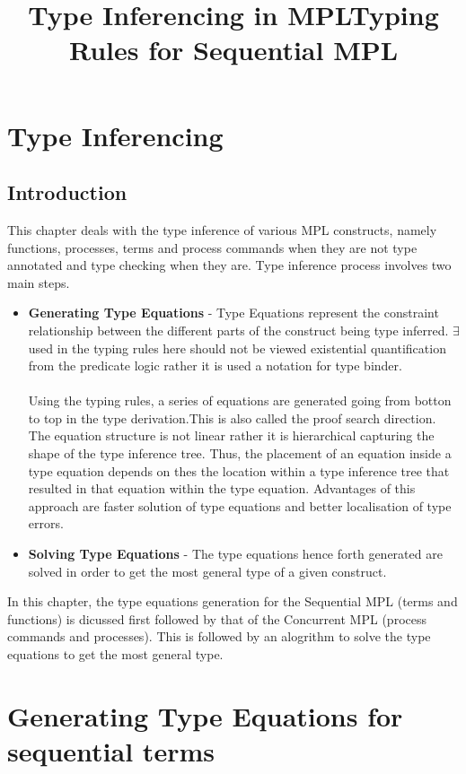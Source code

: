 \documentclass[11pt]{article}
\title{Type Inferencing in MPL}
\title{Typing Rules for Sequential MPL}
\begin{document}
\maketitle

\section{Type Inferencing}

\subsection {Introduction}
This chapter deals with the type inference of various MPL constructs, namely functions, processes, terms and process commands when they are not type annotated and type checking when they are. Type inference process involves two main steps.
\begin {itemize}
\item {\bf Generating Type Equations} - Type Equations represent the constraint relationship between the different parts of the construct being type inferred. $\exists$ used in the typing rules here should not be viewed existential quantification from the predicate logic rather it is used a notation for type binder.
~~\\~~\\
Using the typing rules, a series of equations are generated going from botton to top in the type derivation.This is also called the proof search direction. The equation structure is not linear rather it is hierarchical capturing the shape of the type inference tree. Thus, the placement of an equation inside a type equation depends on thes the location within a type inference tree that resulted in that equation within the type equation. Advantages of this approach are faster solution of type equations and better localisation of type errors.     
\item {\bf Solving Type Equations} - The type equations hence forth generated are solved in order to get the most general type of a given construct.
\end{itemize}
In this chapter, the type equations generation for the Sequential MPL (terms and functions) is dicussed first followed by that of the Concurrent MPL (process commands and processes). This is followed by an alogrithm to solve the type equations to get the most general type.

\section {Generating Type Equations for sequential terms }
\end{document}
